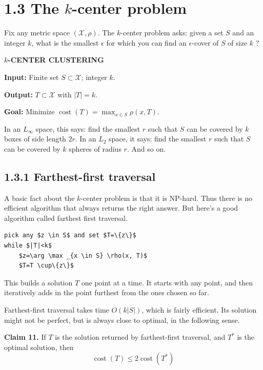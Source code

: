 \documentclass{article}
\begin{document}
\section*{1.3 The $k$-center problem}

Fix any metric space $(\mathcal{X}, \rho)$. The $k$-center problem asks: given a set $S$ and an integer $k$, what is the smallest $\epsilon$ for which you can find an $\epsilon$-cover of $S$ of size $k$ ?

\textbf{$k$-CENTER CLUSTERING}

\textbf{Input:} Finite set $S \subset \mathcal{X}$; integer $k$.

\textbf{Output:} $T \subset \mathcal{X}$ with $|T|=k$.

\textbf{Goal:} Minimize $\operatorname{cost}(T)=\max _{x \in S} \rho(x, T)$.

In an $L_{\infty}$ space, this says: find the smallest $r$ such that $S$ can be covered by $k$ boxes of side length $2 r$. In an $L_{2}$ space, it says: find the smallest $r$ such that $S$ can be covered by $k$ spheres of radius $r$. And so on.

\subsection*{1.3.1 Farthest-first traversal}

A basic fact about the $k$-center problem is that it is NP-hard. Thus there is no efficient algorithm that always returns the right answer. But here's a good algorithm called farthest first traversal.

\begin{verbatim}
pick any $z \in S$ and set $T=\{z\}$
while $|T|<k$
    $z=\arg \max _{x \in S} \rho(x, T)$
    $T=T \cup\{z\}$
\end{verbatim}

This builds a solution $T$ one point at a time. It starts with any point, and then iteratively adds in the point furthest from the ones chosen so far.

Farthest-first traversal takes time $O(k|S|)$, which is fairly efficient. Its solution might not be perfect, but is always close to optimal, in the following sense.

\textbf{Claim 11.} If $T$ is the solution returned by farthest-first traversal, and $T^{*}$ is the optimal solution, then
\begin{equation*}
\operatorname{cost}(T) \leq 2 \operatorname{cost}\left(T^{*}\right)
\end{equation*}
\end{document}
